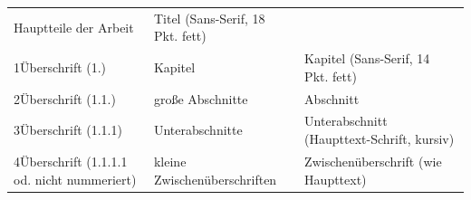 \documentclass[]{book}
\theoremstyle{definition}
\theoremstyle{definition}
\theoremstyle{definition}
\theoremstyle{remark}
\begin{document}
\begin{longtable}[]{@{}lll@{}}
\begin{minipage}[t]{0.41\columnwidth}
Hauptteile der Arbeit\strut
\end{minipage} & \begin{minipage}[t]{0.38\columnwidth}\raggedright\strut
Titel (Sans-Serif, 18 Pkt. fett) \vspace{-6mm}\strut
\end{minipage}\tabularnewline
\begin{minipage}[t]{0.11\columnwidth}\raggedright\strut
1Überschrift (1.)\strut
\end{minipage} & \begin{minipage}[t]{0.41\columnwidth}\raggedright\strut
Kapitel\strut
\end{minipage} & \begin{minipage}[t]{0.38\columnwidth}\raggedright\strut
Kapitel (Sans-Serif, 14 Pkt. fett) \vspace{-6mm}\strut
\end{minipage}\tabularnewline
\begin{minipage}[t]{0.11\columnwidth}\raggedright\strut
2Überschrift (1.1.)\strut
\end{minipage} & \begin{minipage}[t]{0.41\columnwidth}\raggedright\strut
große Abschnitte\strut
\end{minipage} & \begin{minipage}[t]{0.38\columnwidth}\raggedright\strut
Abschnitt\strut
\end{minipage}\tabularnewline
\begin{minipage}[t]{0.11\columnwidth}\raggedright\strut
3Überschrift (1.1.1)\strut
\end{minipage} & \begin{minipage}[t]{0.41\columnwidth}\raggedright\strut
Unterabschnitte\strut
\end{minipage} & \begin{minipage}[t]{0.38\columnwidth}\raggedright\strut
Unterabschnitt (Haupttext-Schrift, kursiv) \vspace{-6mm}\strut
\end{minipage}\tabularnewline
\begin{minipage}[t]{0.11\columnwidth}\raggedright\strut
4Überschrift (1.1.1.1 od. nicht nummeriert)\strut
\end{minipage} & \begin{minipage}[t]{0.41\columnwidth}\raggedright\strut
kleine Zwischenüberschriften\strut
\end{minipage} & \begin{minipage}[t]{0.38\columnwidth}\raggedright\strut
Zwischenüberschrift (wie Haupttext) \vspace{-6mm}\strut

\end{minipage}
\end{longtable}
\end{document}
